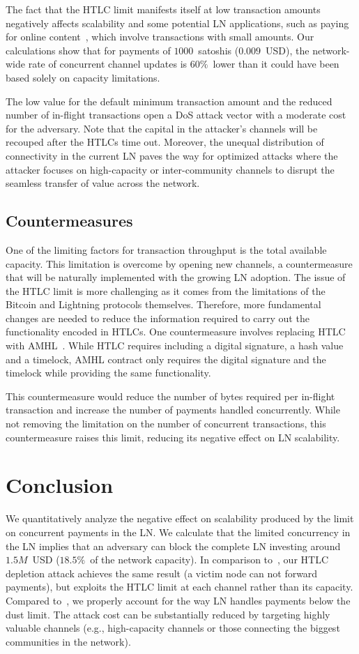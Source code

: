 The fact that the HTLC limit manifests itself at low transaction amounts negatively affects scalability and some potential LN applications, such as paying for online content~\cite{Poon2016}, which involve transactions with small amounts. 
Our calculations show that for payments of $1000$~satoshis ($0.009$~USD), the network-wide rate of concurrent channel updates is $60\%$~lower than it could have been based solely on capacity limitations.

The low value for the default minimum transaction amount and the reduced number of in-flight transactions open a DoS attack vector with a moderate cost for the adversary.
Note that the capital in the attacker's channels will be recouped after the HTLCs time out.
Moreover, the unequal distribution of connectivity in the current LN paves the way for optimized attacks where the attacker focuses on high-capacity or inter-community channels to disrupt the seamless transfer of value across the network.


\subsection{Countermeasures}
One of the limiting factors for transaction throughput is the total available capacity.
This limitation is overcome by opening new channels, a countermeasure that will be naturally implemented with the growing LN adoption.
The issue of the HTLC limit is more challenging as it comes from the limitations of the Bitcoin and Lightning protocols themselves.
Therefore, more fundamental changes are needed to reduce the information required to carry out the functionality encoded in HTLCs.
One countermeasure involves replacing HTLC with AMHL~\cite{Malavolta2019}.
While HTLC requires including a digital signature, a hash value and a timelock, AMHL contract only requires the digital signature and the timelock while providing the same functionality.

This countermeasure would reduce the number of bytes required per in-flight transaction and increase the number of payments handled concurrently.
While not removing the limitation on the number of concurrent transactions, this countermeasure raises this limit, reducing its negative effect on LN scalability.


\section{Conclusion}

We quantitatively analyze the negative effect on scalability produced by the limit on concurrent payments in the LN.
We calculate that the limited concurrency in the LN implies that an adversary can block the complete LN investing around $1.5M$~USD ($18.5\%$~of the network capacity).
In comparison to~\cite{PerezSola2019}, our HTLC depletion attack achieves the same result (a victim node can not forward payments), but exploits the HTLC limit at each channel rather than its capacity.
Compared to~\cite{Mizrahi2020}, we properly account for the way LN handles payments below the dust limit.
The attack cost can be substantially reduced by targeting highly valuable channels (e.g., high-capacity channels or those connecting the biggest communities in the network).